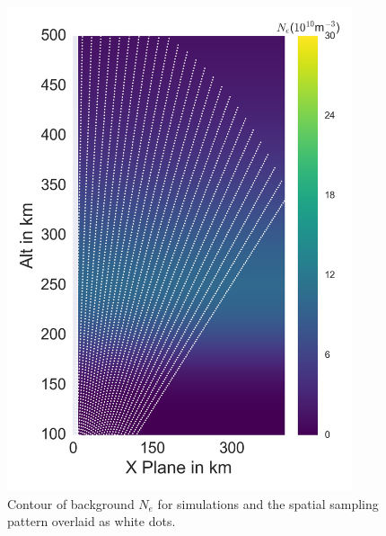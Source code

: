 \documentclass[draft,ras]{agutex}
\begin{document}
\begin{article}
\begin{figure}[!t]
\centering
\includegraphics[width=4in]{backgroundandsamp}
\caption{Contour of background $N_e$ for simulations and the spatial sampling pattern overlaid as white dots.}
\label{fig:background1}
\end{figure}


\end{article}
\end{document}
